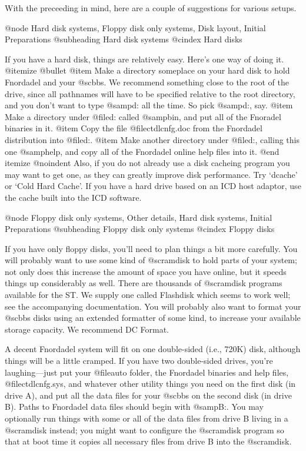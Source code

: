 With the preceeding in mind, here are a couple of suggestions for various
setups.

@node Hard disk systems, Floppy disk only systems, Disk layout, Initial Preparations
@subheading Hard disk systems
@cindex Hard disks

If you have a hard disk, things are relatively easy.  Here's one way
of doing it.
@itemize @bullet
@item
Make a directory someplace on your hard disk to hold
Fnordadel and your @sc{bbs}.  We recommend something close to the root of the
drive, since all pathnames will have to be specified relative to the root
directory, and you don't want to type
@samp{d:\foobar\bletch\blort\weevil\bbs\@dots{}} all the time.
So pick @samp{d:\bbs}, say.  
@item
Make a directory under @file{d:\bbs} called @samp{bin}, and put all of
the Fnoradel binaries in it.
@item
Copy the file @file{ctdlcnfg.doc} from the Fnordadel distribution into
@file{d:\bbs}.
@item
Make another directory under @file{d:\bbs}, calling this one @samp{help},
and copy all of the Fnordadel online help files into it.
@end itemize
@noindent
Also, if you do not already use a disk cacheing program you may want to
get one, as they can greatly improve disk performance.  Try `dcache'
or `Cold Hard Cache'.  If you have a hard drive based on an ICD host
adaptor, use the cache built into the ICD software.

@node Floppy disk only systems, Other details, Hard disk systems, Initial Preparations
@subheading Floppy disk only systems
@cindex Floppy disks

If you have only floppy disks, you'll need to plan things a bit more carefully.
You will probably want to use some
kind of @sc{ram}disk to hold parts of your system; not only does this increase the
amount of space you have online, but it speeds things up considerably as well.
There are thousands of @sc{ram}disk programs available for the ST.  We supply
one called Flashdisk which seems to work well; see the accompanying
documentation.  You will probably also want to format your @sc{bbs} disks
using an extended formatter of some kind, to increase your available storage
capacity.  We recommend DC Format.

A decent Fnordadel system will fit on one double-sided (i.e., 720K) disk,
although things will be a little cramped.  If you have two double-sided drives,
you're laughing---just put your @file{auto} folder, the Fnordadel binaries
and help files, @file{ctdlcnfg.sys}, and whatever other utility things you
need on the first disk (in drive A),
and put all the data files for your @sc{bbs} on the second disk (in drive B).
Paths to Fnordadel data files should begin with @samp{B:\@dots{}}.  You may
optionally run things with some or all of the data files from drive B living
in a @sc{ram}disk instead; you might want to configure the @sc{ram}disk program so that
at boot time it copies all necessary files from drive B into the @sc{ram}disk.

